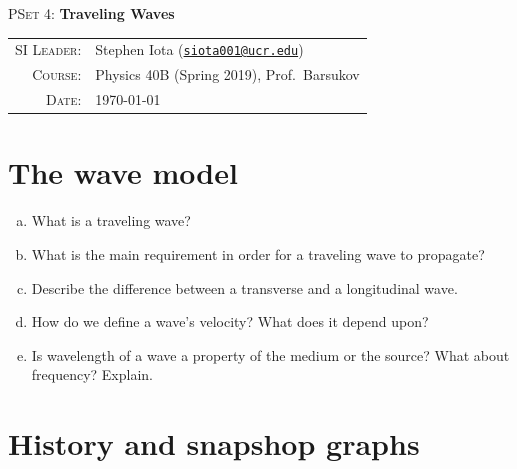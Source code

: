 \documentclass[11pt]{article}
\newcommand{\email}[1]{\texttt{\href{mailto:#1}{#1}}}
\begin{document}
\begin{center}

\Large{\textsc{PSet 4}: \textbf{Traveling Waves}}
\end{center}
\vspace{.5mm}



\begin{tabular}{rl}
\textsc{SI Leader}:
&
Stephen Iota (\email{siota001@ucr.edu})
\\
\textsc{Course}:
&
Physics 40B (Spring 2019), Prof.~Barsukov
\\
\textsc{Date}:
&
\today
\end{tabular}


\section{The wave model}
\begin{enumerate}[(a)]
	\item What is a traveling wave?
	\item What is the main requirement in order for a traveling wave to propagate?
	\item Describe the difference between a transverse and a longitudinal wave.
	\item How do we define a wave's velocity? What does it depend upon?
	\item Is wavelength of a wave a property of the medium or the source? What about frequency? Explain.
\end{enumerate}

\section{History and snapshop graphs}
\end{document}
